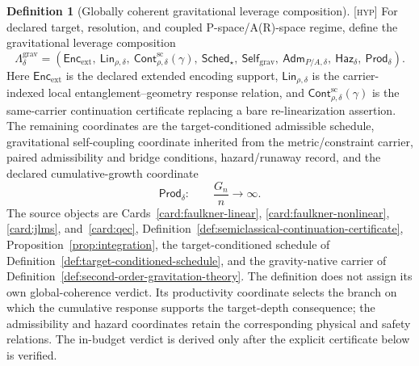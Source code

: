 \documentclass[11pt]{article}
\newcommand{\Hyp}{\textsc{[hyp]}}
\theoremstyle{definition}
\newtheorem{sdefinition}{Definition}
\begin{document}
\begin{sdefinition}[Globally coherent gravitational leverage composition]
\label{def:gravitational-leverage-composition}
\Hyp{} For declared target, resolution, and coupled P-space/A(R)-space regime,
define the gravitational leverage composition
\begin{equation}
\Lambda^{\mathrm{grav}}_\delta=
\left(
\mathsf{Enc}_{\mathrm{ext}},\
\mathsf{Lin}_{\rho,\delta},\
\mathsf{Cont}^{\mathrm{sc}}_{\rho,\delta}(\gamma),\
\mathsf{Sched}_{\star},\
\mathsf{Self}_{\mathrm{grav}},\
\mathsf{Adm}_{P/A,\delta},\
\mathsf{Haz}_{\delta},\
\mathsf{Prod}_{\delta}
\right).
\label{eq:gravitational-leverage-composition}
\end{equation}
Here $\mathsf{Enc}_{\mathrm{ext}}$ is the declared extended encoding support,
$\mathsf{Lin}_{\rho,\delta}$ is the carrier-indexed local
entanglement--geometry response relation, and
$\mathsf{Cont}^{\mathrm{sc}}_{\rho,\delta}(\gamma)$ is the same-carrier
continuation certificate replacing a bare re-linearization assertion. The remaining
coordinates are the target-conditioned admissible schedule,
gravitational self-coupling coordinate inherited from the metric/constraint carrier,
paired admissibility and bridge conditions, hazard/runaway record, and the declared
cumulative-growth coordinate
\begin{equation}
\mathsf{Prod}_{\delta}:\qquad \frac{G_n}{n}\longrightarrow\infty.
\label{eq:productivity-coordinate}
\end{equation}
The source objects are Cards~\ref{card:faulkner-linear},
\ref{card:faulkner-nonlinear}, \ref{card:jlms}, and~\ref{card:qec},
Definition~\ref{def:semiclassical-continuation-certificate},
Proposition~\ref{prop:integration}, the target-conditioned schedule of
Definition~\ref{def:target-conditioned-schedule}, and the gravity-native carrier
of Definition~\ref{def:second-order-gravitation-theory}. The definition does not
assign its own global-coherence verdict. Its productivity coordinate selects the
branch on which the cumulative response supports the target-depth consequence; the
admissibility and hazard coordinates retain the corresponding physical and safety
relations. The in-budget verdict is derived only after the explicit certificate
below is verified.
\end{sdefinition}
\end{document}
